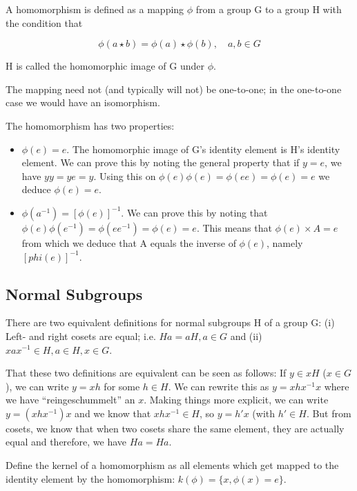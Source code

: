 
A homomorphism is defined as a mapping \(\phi\) from a group G to a
group H with the condition that

\[
\phi(a \star b) = \phi(a) \star \phi(b), \quad a,b \in G
\]

H is called the homomorphic image of G under \(\phi\).

The mapping need not (and typically will not) be one-to-one; in the
one-to-one case we would have an isomorphism.

The homomorphism has two properties:

\begin{itemize}
\item
  \(\phi(e) = e\). The homomorphic image of G's identity element is H's
  identity element. We can prove this by noting the general property
  that if \(y = e\), we have \(yy = ye = y\). Using this on
  \(\phi(e)\phi(e) = \phi(ee) = \phi(e) = e\) we deduce \(\phi(e) = e\).
\item
  \(\phi(a^{-1}) = [\phi(e)]^{-1}\). We can prove this by noting that
  \(\phi(e) \phi(e^{-1}) = \phi(e e^{-1}) = \phi(e) = e\). This means
  that \(\phi(e) \times A = e\) from which we deduce that A equals the
  inverse of \(\phi(e)\), namely \([phi(e)]^{-1}\).
\end{itemize}

\subsection{Normal Subgroups}\label{normal-subgroups}

There are two equivalent definitions for normal subgroups H of a group
G: (i) Left- and right cosets are equal; i.e. \(Ha = aH, a \in G\) and
(ii) \(xax^{-1} \in H, a \in H, x \in G\).

That these two definitions are equivalent can be seen as follows: If
\(y \in xH\) (\(x \in G\)), we can write \(y = xh\) for some
\(h \in H\). We can rewrite this as \(y = xhx^{-1}x\) where we have
``reingeschummelt'' an \(x\). Making things more explicit, we can write
\(y = (xhx^{-1})x\) and we know that $xhx^{-1} \in H$, so \(y = h'x\)
(with \(h' \in H\). But from cosets, we know that when two cosets share
the same element, they are actually equal and therefore, we have
\(Ha = Ha\).

Define the kernel of a homomorphism as all elements which get mapped to
the identity element by the homomorphism: $k(\phi) = \{x, \phi(x) = e\}$.

